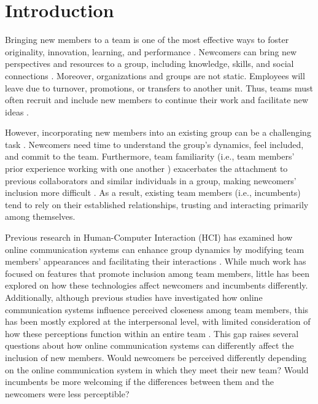 \section{Introduction}
\label{introduction}
Bringing new members to a team is one of the most effective ways to foster originality, innovation, learning, and performance \cite{zeng2021fresh,LEWIS2007159}. Newcomers can bring new perspectives and resources to a group, including knowledge, skills, and social connections \cite{yuan2020making}. Moreover, organizations and groups are not static. Employees will leave due to turnover, promotions, or transfers to another unit. Thus, teams must often recruit and include new members to continue their work and facilitate new ideas \cite{guimera2005}. 

However, incorporating new members into an existing group can be a challenging task \cite{kraut2010dealing}. Newcomers need time to understand the group's dynamics, feel included, and commit to the team. Furthermore, team familiarity (i.e., team members' prior experience working with one another \cite{pasarakonda2023team, muskat2022team}) exacerbates the attachment to previous collaborators and similar individuals in a group, making newcomers' inclusion more difficult \cite{Arcsin2021}. As a result, existing team members (i.e., incumbents) tend to rely on their established relationships, trusting and interacting primarily among themselves. 
 
Previous research in Human-Computer Interaction (HCI) has examined how online communication systems can enhance group dynamics by modifying team members' appearances and facilitating their interactions \cite{harris2019joining,10.1145/2998181.2998300,Whiting2020}. While much work has focused on features that promote inclusion among team members, little has been explored on how these technologies affect newcomers and incumbents differently. Additionally, although previous studies have investigated how online communication systems influence perceived closeness among team members, this has been mostly explored at the interpersonal level, with limited consideration of how these perceptions function within an entire team \cite{Hall2022}. This gap raises several questions about how online communication systems can differently affect the inclusion of new members. Would newcomers be perceived differently depending on the online communication system in which they meet their new team? Would incumbents be more welcoming if the differences between them and the newcomers were less perceptible? 

